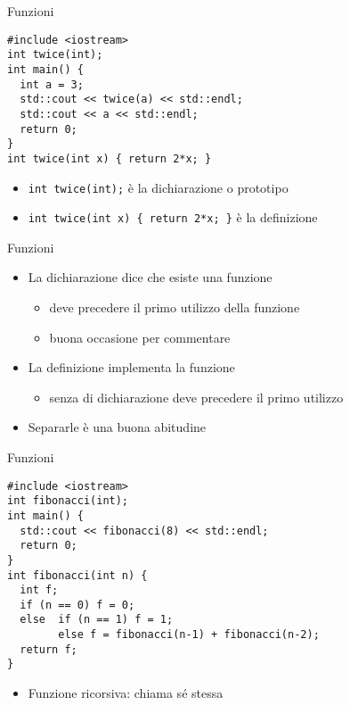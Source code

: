 \begin{frame}[fragile]{Funzioni}
  \vfill
  \begin{lstlisting}
#include <iostream>
int twice(int);
int main() {
  int a = 3;
  std::cout << twice(a) << std::endl;
  std::cout << a << std::endl;
  return 0;
}
int twice(int x) { return 2*x; }
  \end{lstlisting}
  \vfill
  \begin{itemize}
    \item \lstinline$int twice(int);$ è la \alert{dichiarazione} o \alert{prototipo}
    \vfill
    \item \lstinline$int twice(int x) { return 2*x; }$ è la \alert{definizione}
  \end{itemize}
  \vfill
\end{frame}

\begin{frame}[fragile]{Funzioni}
  \vfill
  \begin{itemize}
    \item La dichiarazione dice che esiste una funzione
    \begin{itemize}
      \item deve precedere il primo utilizzo della funzione
      \item buona occasione per commentare
    \end{itemize}
    \vfill
    \item La definizione implementa la funzione
    \begin{itemize}
      \item senza di dichiarazione deve precedere il primo utilizzo
    \end{itemize}
    \vfill
    \item Separarle è una buona abitudine
  \end{itemize}
  \vfill
\end{frame}

\begin{frame}[fragile]{Funzioni}
  \vfill
  \begin{lstlisting}
#include <iostream>
int fibonacci(int);
int main() {
  std::cout << fibonacci(8) << std::endl;
  return 0;
}
int fibonacci(int n) {
  int f;
  if (n == 0) f = 0;
  else  if (n == 1) f = 1;
        else f = fibonacci(n-1) + fibonacci(n-2);
  return f;
}
  \end{lstlisting}
  \vfill
  \begin{itemize}
    \item Funzione \alert{ricorsiva}: chiama sé stessa
  \end{itemize}
  \vfill
\end{frame}

